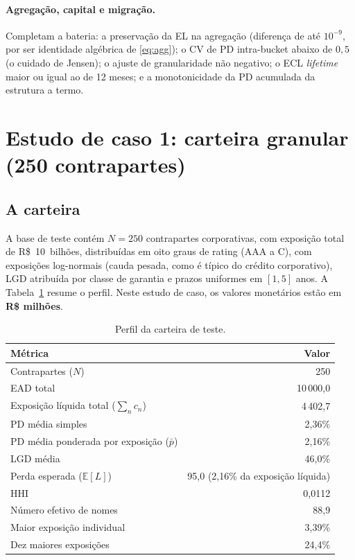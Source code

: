 \documentclass[11pt,a4paper]{article}
\newcommand{\E}{\mathbb{E}}
\begin{document}
\paragraph{Agregação, capital e migração.} Completam a bateria: a preservação da EL na agregação (diferença de até $10^{-9}$, por ser identidade algébrica de \eqref{eq:agg}); o CV de PD intra-bucket abaixo de $0{,}5$ (o cuidado de Jensen); o ajuste de granularidade não negativo; o ECL \emph{lifetime} maior ou igual ao de 12 meses; e a monotonicidade da PD acumulada da estrutura a termo.

\section{Estudo de caso 1: carteira granular (250 contrapartes)}

\subsection{A carteira}

A base de teste contém $N=250$ contrapartes corporativas, com exposição total de R\$~10~bilhões, distribuídas em oito graus de rating (AAA a C), com exposições log-normais (cauda pesada, como é típico do crédito corporativo), LGD atribuída por classe de garantia e prazos uniformes em $[1,5]$ anos. A Tabela~\ref{tab:resumo} resume o perfil. Neste estudo de caso, os valores monetários estão em \textbf{R\$ milhões}.

\begin{table}[htb]
\centering\small
\caption{Perfil da carteira de teste.}
\label{tab:resumo}
\begin{tabular}{lr}
\toprule
Métrica & Valor \\
\midrule
Contrapartes ($N$) & 250 \\
EAD total & 10\,000{,}0 \\
Exposição líquida total ($\sum_n c_n$) & 4\,402{,}7 \\
PD média simples & 2{,}36\% \\
PD média ponderada por exposição ($\bar p$) & 2{,}16\% \\
LGD média & 46{,}0\% \\
Perda esperada ($\E[L]$) & 95{,}0 \;(2{,}16\% da exposição líquida) \\
HHI & 0{,}0112 \\
Número efetivo de nomes & 88{,}9 \\
Maior exposição individual & 3{,}39\% \\
Dez maiores exposições & 24{,}4\% \\
\bottomrule
\end{tabular}
\end{table}
\end{document}
